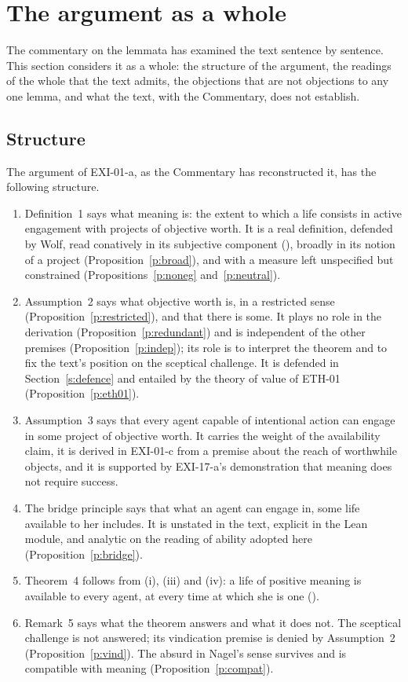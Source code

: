 \section{The argument as a whole}\label{s:whole}

The commentary on the lemmata has examined the text sentence by sentence. This section considers it as a whole: the structure of the argument, the readings of the whole that the text admits, the objections that are not objections to any one lemma, and what the text, with the Commentary, does not establish.

\subsection{Structure}

The argument of EXI-01-a, as the Commentary has reconstructed it, has the following structure.

\begin{enumerate}[label=(\roman*)]
\item Definition~1 says what meaning is: the extent to which a life consists in active engagement with projects of objective worth. It is a real definition, defended by Wolf, read conatively in its subjective component (), broadly in its notion of a project (Proposition~\ref{p:broad}), and with a measure left unspecified but constrained (Propositions~\ref{p:noneg} and~\ref{p:neutral}).
\item Assumption~2 says what objective worth is, in a restricted sense (Proposition~\ref{p:restricted}), and that there is some. It plays no role in the derivation (Proposition~\ref{p:redundant}) and is independent of the other premises (Proposition~\ref{p:indep}); its role is to interpret the theorem and to fix the text's position on the sceptical challenge. It is defended in Section~\ref{s:defence} and entailed by the theory of value of ETH-01 (Proposition~\ref{p:eth01}).
\item Assumption~3 says that every agent capable of intentional action can engage in some project of objective worth. It carries the weight of the availability claim, it is derived in EXI-01-c from a premise about the reach of worthwhile objects, and it is supported by EXI-17-a's demonstration that meaning does not require success.
\item The bridge principle says that what an agent can engage in, some life available to her includes. It is unstated in the text, explicit in the Lean module, and analytic on the reading of ability adopted here (Proposition~\ref{p:bridge}).
\item Theorem~4 follows from (i), (iii) and (iv): a life of positive meaning is available to every agent, at every time at which she is one ().
\item Remark~5 says what the theorem answers and what it does not. The sceptical challenge is not answered; its vindication premise is denied by Assumption~2 (Proposition~\ref{p:vind}). The absurd in Nagel's sense survives and is compatible with meaning (Proposition~\ref{p:compat}).
\end{enumerate}

